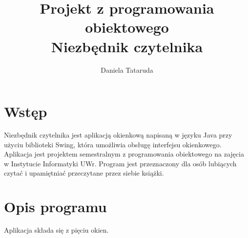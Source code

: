 \documentclass[a4paper,10pt]{article}
\title{
	Projekt z programowania obiektowego\\
	Niezbędnik czytelnika}
\author{Daniela Tataruda}
\begin{document}
\maketitle

\section{Wstęp}

Niezbędnik czytelnika jest aplikacją okienkową napisaną w języku Java przy użyciu biblioteki Swing, która umożliwia obsługę interfejsu okienkowego. Aplikacja jest projektem semestralnym z programowania obiektowego na zajęcia w Instytucie Informatyki UWr. Program jest przeznaczony dla osób lubiących czytać i upamiętniać przeczytane przez siebie książki.
\section{Opis programu}
Aplikacja składa się z pięciu okien.
\end{document}
